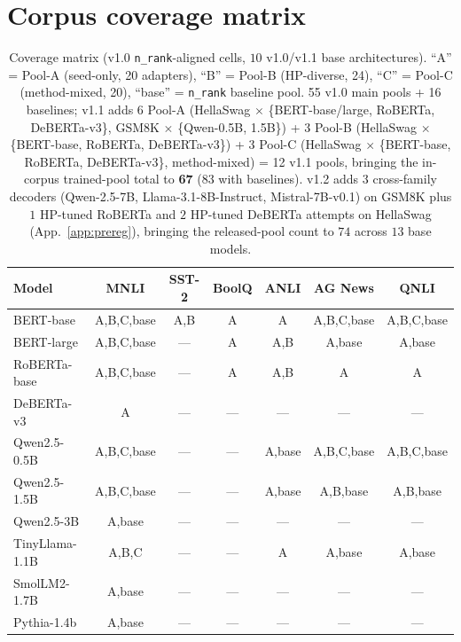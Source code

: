 \documentclass[11pt]{article}
\begin{document}
\section{Corpus coverage matrix}\label{app:coverage}
\begin{table}[t]
\centering
\caption{Coverage matrix (v1.0 \texttt{n\_rank}-aligned cells, $10$ v1.0/v1.1 base architectures). ``A'' = Pool-A (seed-only, 20 adapters), ``B'' = Pool-B (HP-diverse, 24), ``C'' = Pool-C (method-mixed, 20), ``base'' = \texttt{n\_rank} baseline pool. 55 v1.0 main pools + 16 baselines; v1.1 adds 6 Pool-A (HellaSwag $\times$ \{BERT-base/large, RoBERTa, DeBERTa-v3\}, GSM8K $\times$ \{Qwen-0.5B, 1.5B\}) + 3 Pool-B (HellaSwag $\times$ \{BERT-base, RoBERTa, DeBERTa-v3\}) + 3 Pool-C (HellaSwag $\times$ \{BERT-base, RoBERTa, DeBERTa-v3\}, method-mixed) = 12 v1.1 pools, bringing the in-corpus trained-pool total to \textbf{67} (83 with baselines). v1.2 adds $3$ cross-family decoders (Qwen-2.5-7B, Llama-3.1-8B-Instruct, Mistral-7B-v0.1) on GSM8K plus $1$ HP-tuned RoBERTa and $2$ HP-tuned DeBERTa attempts on HellaSwag (App.~\ref{app:prereg}), bringing the released-pool count to $74$ across $13$ base models.}
\label{tab:coverage}
\small
\setlength{\tabcolsep}{4pt}
\begin{tabular}{l|cccccc}
\toprule
Model & MNLI & SST-2 & BoolQ & ANLI & AG News & QNLI \\
\midrule
BERT-base & A,B,C,base & A,B & A & A & A,B,C,base & A,B,C,base \\
BERT-large & A,B,C,base & --- & A & A,B & A,base & A,base \\
RoBERTa-base & A,B,C,base & --- & A & A,B & A & A \\
DeBERTa-v3 & A & --- & --- & --- & --- & --- \\
Qwen2.5-0.5B & A,B,C,base & --- & --- & A,base & A,B,C,base & A,B,C,base \\
Qwen2.5-1.5B & A,B,C,base & --- & --- & A,base & A,B,base & A,B,base \\
Qwen2.5-3B & A,base & --- & --- & --- & --- & --- \\
TinyLlama-1.1B & A,B,C & --- & --- & A & A,base & A,base \\
SmolLM2-1.7B & A,base & --- & --- & --- & --- & --- \\
Pythia-1.4b & A,base & --- & --- & --- & --- & --- \\
\bottomrule
\end{tabular}
\end{table}
\end{document}
